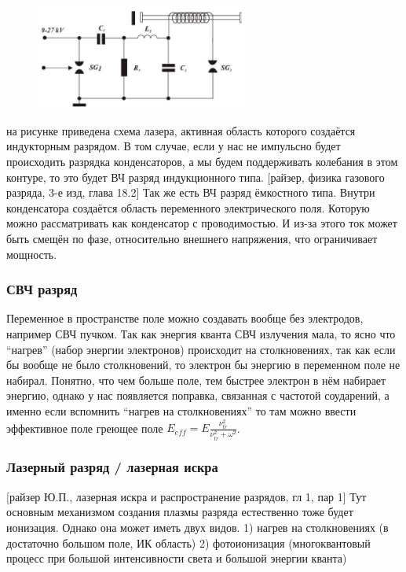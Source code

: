 \documentclass[10pt, a4paper]{article}
\begin{document}
\begin{figure}[ht]
	\begin{center}
		\includegraphics[width=70mm]{12.5.jpg}
	\end{center}
\end{figure}

на рисунке приведена схема лазера, активная область которого создаётся индукторным разрядом.
В том случае, если у нас не импульсно будет происходить разрядка конденсаторов, а мы будем поддерживать колебания в этом контуре, то это будет ВЧ разряд индукционного типа.
[райзер, физика газового разряда, 3-е изд, глава 18.2]
Так же есть ВЧ разряд ёмкостного типа. Внутри конденсатора создаётся область переменного электрического поля. Которую можно рассматривать как конденсатор с проводимостью. И из-за этого ток может быть смещён по фазе, относительно внешнего напряжения, что ограничивает мощность.
\subsubsection{СВЧ разряд}
Переменное в пространстве поле можно создавать вообще без электродов, например СВЧ пучком. Так как энергия кванта СВЧ излучения мала, то ясно что “нагрев” (набор энергии электронов) происходит на столкновениях,  так как если бы вообще не было столкновений, то электрон бы энергию в переменном поле не набирал. Понятно, что чем больше поле, тем быстрее электрон в нём набирает энергию, однако у нас появляется поправка, связанная с частотой соударений, а именно если вспомнить “нагрев на столкновениях” то там можно ввести эффективное поле греющее поле $E_{eff}=E \frac{\nu_{tr}^{2}}{\nu_{tr}^{2}+\omega^{2}}$. 
\subsubsection{Лазерный разряд / лазерная искра}
[райзер Ю.П., лазерная искра и распространение разрядов, гл 1, пар 1]
Тут основным механизмом создания плазмы разряда естественно тоже будет ионизация. Однако она может иметь двух видов. 1) нагрев на столкновениях (в достаточно большом поле, ИК область) 2) фотоионизация (многоквантовый процесс при большой интенсивности света и большой энергии кванта)
\end{document}
